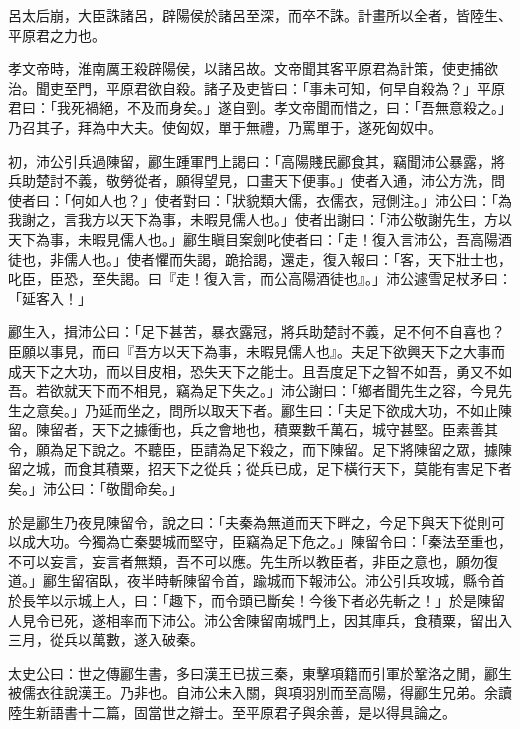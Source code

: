 \begin{pinyinscope}
呂太后崩，大臣誅諸呂，辟陽侯於諸呂至深，而卒不誅。計畫所以全者，皆陸生、平原君之力也。

孝文帝時，淮南厲王殺辟陽侯，以諸呂故。文帝聞其客平原君為計策，使吏捕欲治。聞吏至門，平原君欲自殺。諸子及吏皆曰：「事未可知，何早自殺為？」平原君曰：「我死禍絕，不及而身矣。」遂自剄。孝文帝聞而惜之，曰：「吾無意殺之。」乃召其子，拜為中大夫。使匈奴，單于無禮，乃罵單于，遂死匈奴中。

初，沛公引兵過陳留，酈生踵軍門上謁曰：「高陽賤民酈食其，竊聞沛公暴露，將兵助楚討不義，敬勞從者，願得望見，口畫天下便事。」使者入通，沛公方洗，問使者曰：「何如人也？」使者對曰：「狀貌類大儒，衣儒衣，冠側注。」沛公曰：「為我謝之，言我方以天下為事，未暇見儒人也。」使者出謝曰：「沛公敬謝先生，方以天下為事，未暇見儒人也。」酈生瞋目案劍叱使者曰：「走！復入言沛公，吾高陽酒徒也，非儒人也。」使者懼而失謁，跪拾謁，還走，復入報曰：「客，天下壯士也，叱臣，臣恐，至失謁。曰『走！復入言，而公高陽酒徒也』。」沛公遽雪足杖矛曰：「延客入！」

酈生入，揖沛公曰：「足下甚苦，暴衣露冠，將兵助楚討不義，足不何不自喜也？臣願以事見，而曰『吾方以天下為事，未暇見儒人也』。夫足下欲興天下之大事而成天下之大功，而以目皮相，恐失天下之能士。且吾度足下之智不如吾，勇又不如吾。若欲就天下而不相見，竊為足下失之。」沛公謝曰：「鄉者聞先生之容，今見先生之意矣。」乃延而坐之，問所以取天下者。酈生曰：「夫足下欲成大功，不如止陳留。陳留者，天下之據衝也，兵之會地也，積粟數千萬石，城守甚堅。臣素善其令，願為足下說之。不聽臣，臣請為足下殺之，而下陳留。足下將陳留之眾，據陳留之城，而食其積粟，招天下之從兵；從兵已成，足下橫行天下，莫能有害足下者矣。」沛公曰：「敬聞命矣。」

於是酈生乃夜見陳留令，說之曰：「夫秦為無道而天下畔之，今足下與天下從則可以成大功。今獨為亡秦嬰城而堅守，臣竊為足下危之。」陳留令曰：「秦法至重也，不可以妄言，妄言者無類，吾不可以應。先生所以教臣者，非臣之意也，願勿復道。」酈生留宿臥，夜半時斬陳留令首，踰城而下報沛公。沛公引兵攻城，縣令首於長竿以示城上人，曰：「趣下，而令頭已斷矣！今後下者必先斬之！」於是陳留人見令已死，遂相率而下沛公。沛公舍陳留南城門上，因其庫兵，食積粟，留出入三月，從兵以萬數，遂入破秦。

太史公曰：世之傳酈生書，多曰漢王已拔三秦，東擊項籍而引軍於鞏洛之閒，酈生被儒衣往說漢王。乃非也。自沛公未入關，與項羽別而至高陽，得酈生兄弟。余讀陸生新語書十二篇，固當世之辯士。至平原君子與余善，是以得具論之。


\end{pinyinscope}